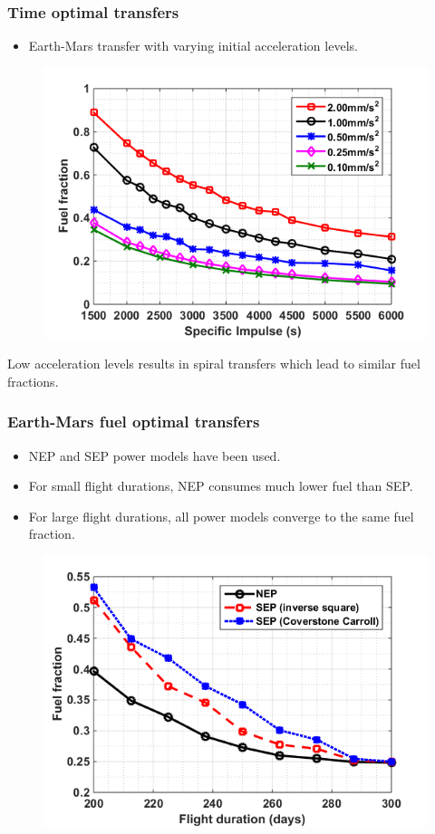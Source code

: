 \documentclass{beamer}
\begin{document}
\begin{frame}
	\frametitle{Time optimal transfers}
	\vspace{-5mm}
	\begin{itemize}
		\item Earth-Mars transfer with varying initial acceleration levels.
	\end{itemize}
	\vspace{-6mm}
	\begin{figure}
		\centering\includegraphics[width=0.65\linewidth]{Imgs/Fuelfrac_isp.png}
	\end{figure}
Low acceleration levels results in spiral transfers which lead to similar fuel fractions.
\end{frame}


\begin{frame}
	\frametitle{Earth-Mars fuel optimal transfers}
	\vspace{-3mm}
	\begin{itemize}
		\item NEP and SEP power models have been used.
		\item For small flight durations, NEP consumes much lower fuel than SEP.
		\item For large flight durations, all power models converge to the same fuel fraction.
	\end{itemize}
	\vspace{-3.25mm}
	\begin{figure}
		\centering\includegraphics[width=0.60\linewidth]{Imgs/FuelOptParam.png}
	\end{figure}
\end{frame}
\end{document}
